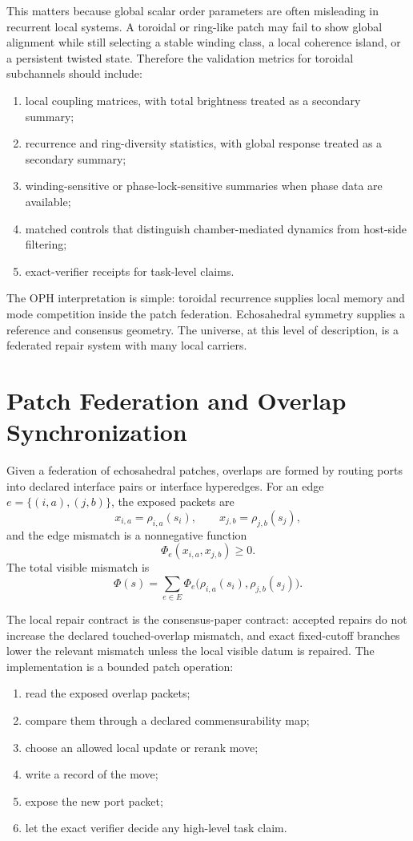 \documentclass[11pt]{article}
\theoremstyle{remark}
\theoremstyle{plain}
\begin{document}
This matters because global scalar order parameters are often misleading in recurrent local
systems. A toroidal or ring-like patch may fail to show global alignment while still selecting a
stable winding class, a local coherence island, or a persistent twisted state. Therefore the
validation metrics for toroidal subchannels should include:
\begin{enumerate}[leftmargin=2em]
\item local coupling matrices, with total brightness treated as a secondary summary;
\item recurrence and ring-diversity statistics, with global response treated as a secondary summary;
\item winding-sensitive or phase-lock-sensitive summaries when phase data are available;
\item matched controls that distinguish chamber-mediated dynamics from host-side filtering;
\item exact-verifier receipts for task-level claims.
\end{enumerate}

The OPH interpretation is simple: toroidal recurrence supplies local memory and mode competition
inside the patch federation. Echosahedral symmetry supplies a reference and consensus geometry.
The universe, at this level of description, is a federated repair system with many local carriers.

\section{Patch Federation and Overlap Synchronization}

Given a federation of echosahedral patches, overlaps are formed by routing ports into declared
interface pairs or interface hyperedges. For an edge \(e=\{(i,a),(j,b)\}\), the exposed packets
are
\[
x_{i,a}=\rho_{i,a}(s_i),\qquad x_{j,b}=\rho_{j,b}(s_j),
\]
and the edge mismatch is a nonnegative function
\[
\Phi_e(x_{i,a},x_{j,b})\ge 0.
\]
The total visible mismatch is
\[
\Phi(s)=\sum_{e\in E}\Phi_e\bigl(\rho_{i,a}(s_i),\rho_{j,b}(s_j)\bigr).
\]

The local repair contract is the consensus-paper contract: accepted repairs do not increase the
declared touched-overlap mismatch, and exact fixed-cutoff branches lower the relevant mismatch
unless the local visible datum is repaired. The implementation is a bounded patch operation:
\begin{enumerate}[leftmargin=2em]
\item read the exposed overlap packets;
\item compare them through a declared commensurability map;
\item choose an allowed local update or rerank move;
\item write a record of the move;
\item expose the new port packet;
\item let the exact verifier decide any high-level task claim.
\end{enumerate}
\end{document}
